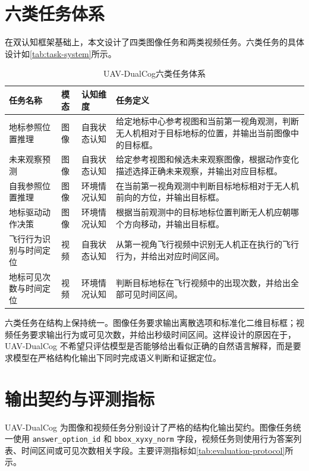 \section{六类任务体系}

在双认知框架基础上，本文设计了四类图像任务和两类视频任务。六类任务的具体设计如\autoref{tab:task-system}所示。

\begin{table}[htbp]
    \centering
    \caption{UAV-DualCog六类任务体系}
    \label{tab:task-system}
    \begin{tabularx}{\textwidth}{p{3.0cm}p{1.6cm}p{2.0cm}X}
        \toprule
        任务名称 & 模态 & 认知维度 & 任务定义 \\
        \midrule
        地标参照位置推理 & 图像 & 自我状态认知 & 给定地标中心参考视图和当前第一视角观测，判断无人机相对于目标地标的位置，并输出当前图像中的目标框。 \\
        未来观察预测 & 图像 & 自我状态认知 & 给定参考视图和候选未来观察图像，根据动作变化描述选择正确未来观察，并输出对应目标框。 \\
        自我参照位置推理 & 图像 & 环境情况认知 & 在当前第一视角观测中判断目标地标相对于无人机前向的方位，并输出目标框。 \\
        地标驱动动作决策 & 图像 & 环境情况认知 & 根据当前观测中的目标地标位置判断无人机应朝哪个方向移动，并输出目标框。 \\
        飞行行为识别与时间定位 & 视频 & 自我状态认知 & 从第一视角飞行视频中识别无人机正在执行的飞行行为，并给出对应时间区间。 \\
        地标可见次数与时间定位 & 视频 & 环境情况认知 & 判断目标地标在飞行视频中的出现次数，并给出全部可见时间区间。 \\
        \bottomrule
    \end{tabularx}
\end{table}

六类任务在结构上保持统一。图像任务要求输出离散选项和标准化二维目标框；视频任务要求输出行为或可见次数，并给出秒级时间区间。这样设计的原因在于，UAV-DualCog 不希望只评估模型是否能够给出看似正确的自然语言解释，而是要求模型在严格结构化输出下同时完成语义判断和证据定位。

\section{输出契约与评测指标}

UAV-DualCog 为图像和视频任务分别设计了严格的结构化输出契约。图像任务统一使用 \texttt{answer\_option\_id} 和 \texttt{bbox\_xyxy\_norm} 字段，视频任务则使用行为答案列表、时间区间或可见次数相关字段。主要评测指标如\autoref{tab:evaluation-protocol}所示。

